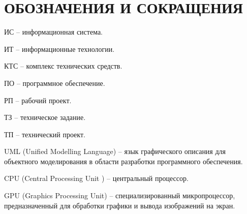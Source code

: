 \section*{ОБОЗНАЧЕНИЯ И СОКРАЩЕНИЯ}

ИС -- информационная система.

ИТ -- информационные технологии. 

КТС -- комплекс технических средств.

ПО -- программное обеспечение.

РП -- рабочий проект.

ТЗ -- техническое задание.

ТП -- технический проект.

UML (Unified Modelling Language) -- язык графического описания для объектного моделирования в области разработки программного обеспечения.

CPU (Central Processing Unit ) -- центральный процессор.

GPU (Graphics Processing Unit) -- специализированный микропроцессор, предназначенный для обработки графики и вывода изображений на экран.